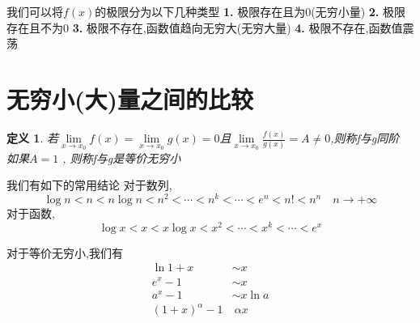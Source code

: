 \documentclass[UTF8,11pt]{ctexart}
\theoremstyle{cnthm}
\newtheorem{defn}[thm]{定义}
\begin{document}
我们可以将$f(x)$的极限分为以下几种类型
\noindent\textbf{1.} 极限存在且为0(无穷小量)
\noindent\textbf{2.} 极限存在且不为0
\noindent\textbf{3.} 极限不存在,函数值趋向无穷大(无穷大量)
\noindent\textbf{4.} 极限不存在,函数值震荡

\section{无穷小(大)量之间的比较}

\begin{defn}
若$\lim\limits_{x \to x_0}f(x) = \lim\limits_{x \to x_0}g(x) = 0$且$\lim\limits_{x \to x_0} \frac{f(x)}{g(x)} = A \neq 0$,则称f与g同阶
如果$A = 1$ , 则称f与g是等价无穷小
\end{defn}

我们有如下的常用结论
对于数列,
\[
\log{n}<n<n\log{n}<n^2<\cdots<n^k<\cdots<e^n<n!<n^n \quad n \to +\infty
\]
对于函数,
\[
\log{x}<x<x\log{x}<x^2<\cdots<x^k<\cdots<e^x
\]

对于等价无穷小,我们有
\[
\begin{aligned}
\ln{1+x} &\sim x\\
e^x - 1 &\sim x\\
a^x - 1 &\sim x\ln{a}\\
(1+x)^\alpha -1 &~ \alpha x
\end{aligned}
\]
\end{document}
